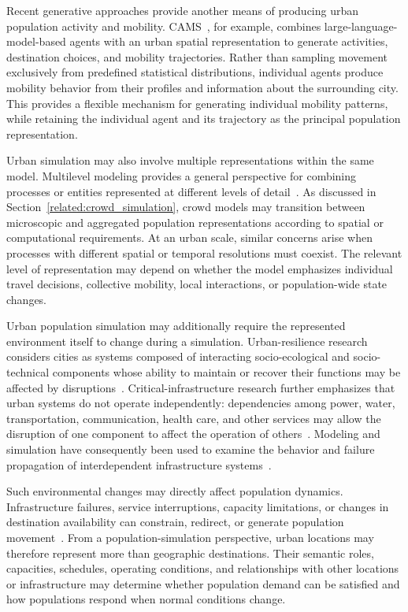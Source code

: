 Recent generative approaches provide another means of producing urban population activity and mobility. CAMS~\cite{du2025camscitygptpoweredagenticframework}, for example, combines large-language-model-based agents with an urban spatial representation to generate activities, destination choices, and mobility trajectories. Rather than sampling movement exclusively from predefined statistical distributions, individual agents produce mobility behavior from their profiles and information about the surrounding city. This provides a flexible mechanism for generating individual mobility patterns, while retaining the individual agent and its trajectory as the principal population representation.

Urban simulation may also involve multiple representations within the same model. Multilevel modeling provides a general perspective for combining processes or entities represented at different levels of detail~\cite{serana2023multilevelmodeling}. As discussed in Section~\ref{related:crowd_simulation}, crowd models may transition between microscopic and aggregated population representations according to spatial or computational requirements. At an urban scale, similar concerns arise when processes with different spatial or temporal resolutions must coexist. The relevant level of representation may depend on whether the model emphasizes individual travel decisions, collective mobility, local interactions, or population-wide state changes.

Urban population simulation may additionally require the represented environment itself to change during a simulation. Urban-resilience research considers cities as systems composed of interacting socio-ecological and socio-technical components whose ability to maintain or recover their functions may be affected by disruptions~\cite{meerow2016urbanResilience}. Critical-infrastructure research further emphasizes that urban systems do not operate independently: dependencies among power, water, transportation, communication, health care, and other services may allow the disruption of one component to affect the operation of others~\cite{rinaldi2001infrastructureInterdependencies}. Modeling and simulation have consequently been used to examine the behavior and failure propagation of interdependent infrastructure systems~\cite{ouyang2014interdependentInfrastructure}.

Such environmental changes may directly affect population dynamics. Infrastructure failures, service interruptions, capacity limitations, or changes in destination availability can constrain, redirect, or generate population movement~\cite{haraguchi2022mobilityDataReview}. From a population-simulation perspective, urban locations may therefore represent more than geographic destinations. Their semantic roles, capacities, schedules, operating conditions, and relationships with other locations or infrastructure may determine whether population demand can be satisfied and how populations respond when normal conditions change.

